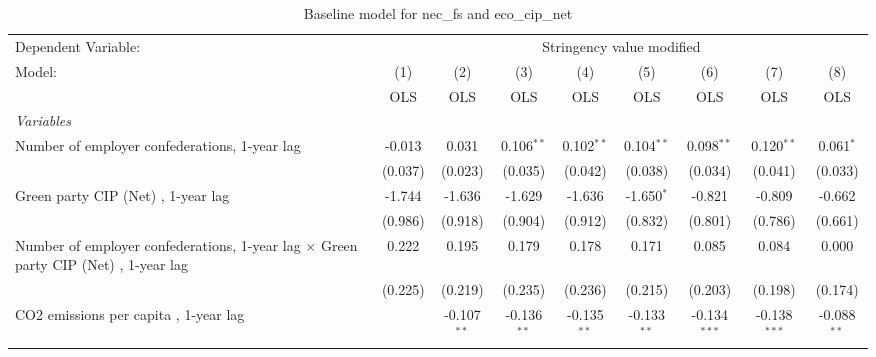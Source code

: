 
\begin{table}[htbp]
   \caption{Baseline model for nec\_fs and eco\_cip\_net}
   \centering
   \begin{tabular}{lcccccccc}
      \toprule
      Dependent Variable: & \multicolumn{8}{c}{Stringency value modified}\\
      Model:                                                                                     & (1)     & (2)           & (3)           & (4)           & (5)           & (6)            & (7)            & (8)\\  
                                                                                                 &  OLS    & OLS           & OLS           & OLS           & OLS           & OLS            & OLS            & OLS\\  
      \midrule
      \emph{Variables}\\
      Number of employer confederations, 1-year lag                                              & -0.013  & 0.031         & 0.106$^{**}$  & 0.102$^{**}$  & 0.104$^{**}$  & 0.098$^{**}$   & 0.120$^{**}$   & 0.061$^{*}$\\   
                                                                                                 & (0.037) & (0.023)       & (0.035)       & (0.042)       & (0.038)       & (0.034)        & (0.041)        & (0.033)\\   
      Green party CIP (Net) , 1-year lag                                                         & -1.744  & -1.636        & -1.629        & -1.636        & -1.650$^{*}$  & -0.821         & -0.809         & -0.662\\   
                                                                                                 & (0.986) & (0.918)       & (0.904)       & (0.912)       & (0.832)       & (0.801)        & (0.786)        & (0.661)\\   
      Number of employer confederations, 1-year lag $\times$ Green party CIP (Net) , 1-year lag  & 0.222   & 0.195         & 0.179         & 0.178         & 0.171         & 0.085          & 0.084          & 0.000\\   
                                                                                                 & (0.225) & (0.219)       & (0.235)       & (0.236)       & (0.215)       & (0.203)        & (0.198)        & (0.174)\\   
      CO2 emissions per capita , 1-year lag                                                      &         & -0.107$^{**}$ & -0.136$^{**}$ & -0.135$^{**}$ & -0.133$^{**}$ & -0.134$^{***}$ & -0.138$^{***}$ & -0.088$^{**}$\\   

\end{tabular}
\end{table}
